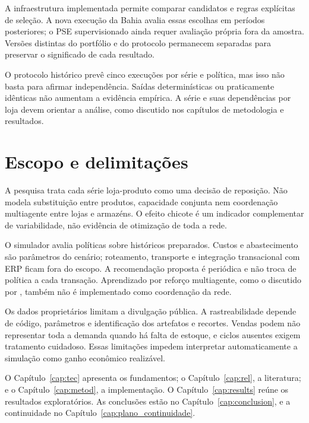 A infraestrutura implementada permite comparar candidatos e regras explícitas de seleção. A nova execução da Bahia avalia essas escolhas em períodos posteriores; o PSE supervisionado ainda requer avaliação própria fora da amostra. Versões distintas do portfólio e do protocolo permanecem separadas para preservar o significado de cada resultado.

O protocolo histórico prevê cinco execuções por série e política, mas isso não basta para afirmar independência. Saídas determinísticas ou praticamente idênticas não aumentam a evidência empírica. A série e suas dependências por loja devem orientar a análise, como discutido nos capítulos de metodologia e resultados.

\section{Escopo e delimitações}
\label{sec:delimitacoes}

A pesquisa trata cada série loja-produto como uma decisão de reposição. Não modela substituição entre produtos, capacidade conjunta nem coordenação multiagente entre lojas e armazéns. O efeito chicote é um indicador complementar de variabilidade, não evidência de otimização de toda a rede.

O simulador avalia políticas sobre históricos preparados. Custos e abastecimento são parâmetros do cenário; roteamento, transporte e integração transacional com ERP ficam fora do escopo. A recomendação proposta é periódica e não troca de política a cada transação. Aprendizado por reforço multiagente, como o discutido por \citet{Liu2024HAPPO}, também não é implementado como coordenação da rede.

Os dados proprietários limitam a divulgação pública. A rastreabilidade depende de código, parâmetros e identificação dos artefatos e recortes. Vendas podem não representar toda a demanda quando há falta de estoque, e ciclos ausentes exigem tratamento cuidadoso. Essas limitações impedem interpretar automaticamente a simulação como ganho econômico realizável.

O Capítulo~\ref{cap:tec} apresenta os fundamentos; o Capítulo~\ref{cap:rel}, a literatura; e o Capítulo~\ref{cap:metod}, a implementação. O Capítulo~\ref{cap:results} reúne os resultados exploratórios. As conclusões estão no Capítulo~\ref{cap:conclusion}, e a continuidade no Capítulo~\ref{cap:plano_continuidade}.

\newpage\lhead{\rightmark}
